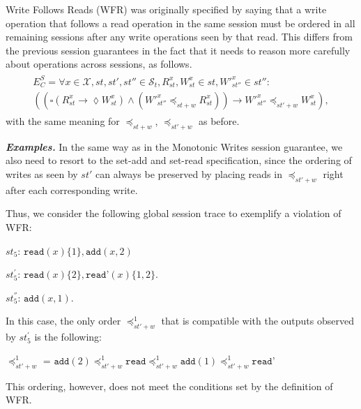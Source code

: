 \documentclass[conference]{IEEEtran}
\begin{document}
	Write Follows Reads (WFR)  was originally specified by saying that a write operation that follows a read operation in the same session must be ordered in all remaining sessions after any write operations seen by that read. This differs from the previous session guarantees in the fact that it needs to reason more carefully about operations across sessions, as follows. \\
	\begin{align}\label{eqn:WFR}
	\begin{split}
	E^S_C =    \forall x \in \mathcal{X}, \mathit{st}, \mathit{st'}, \mathit{st''} \in \mathcal{S}_t, R_\mathit{st}^x,  W_\mathit{st}^x \in \mathit{st}, W'^x_\mathit{st''} \in \mathit{st''}:  \\
	\left(  \left(
	\square \left( R^x_{\mathit{st}} \rightarrow \lozenge W^x_{\mathit{st}} \right)
	\wedge
	\left(  W'^x_\mathit{st''} \preccurlyeq_{\mathit{st}+w} R^x_{\mathit{st}} \right)
	\right)
	\rightarrow
	W'^x_{\mathit{st}''} \preccurlyeq_{\mathit{st'}+w} W_{\mathit{st}}^x \right),
	\end{split}
	\end{align}
	with the same meaning for $\preccurlyeq_{\mathit{st}+w}$, $\preccurlyeq_{\mathit{st}'+w}$ as before.
	
	
	\noindent \emph{\textbf{Examples.}}
	In the same way as in the Monotonic Writes session guarantee, we also need to resort to the set-add and set-read specification, since the ordering of writes as seen by $st'$ can always be preserved by placing reads in $\preccurlyeq_{\mathit{st'}+w}$ right after each corresponding write.
	
	Thus, we consider the following global session trace to exemplify a violation of WFR:
	
	
	$\mathit{st}_5$: $\texttt{read}(x){\{1\}},\texttt{add}(x,2)$
	
	$\mathit{st}_5^{'}$: $\texttt{read}(x){\{2\}},\texttt{read'}(x){\{1,2\}}$.
	
	$\mathit{st}_5^{''}$: $\texttt{add}(x,1)$.
	
	In this case, the only order $\preccurlyeq_{\mathit{st'}+w}^1$ that is compatible with the outputs observed by $\mathit{st}_5^{'}$ is the following:
	
	\noindent $\preccurlyeq_{\mathit{st'}+w}^1$ = $\texttt{add}(2) \preccurlyeq_{\mathit{st'}+w}^1 \texttt{read}
	\preccurlyeq_{\mathit{st'}+w}^1  \texttt{add}(1) \preccurlyeq_{\mathit{st'}+w}^1 \texttt{read'}$
	
	This ordering, however, does not meet the conditions set by the definition of WFR.
	
\end{document}
